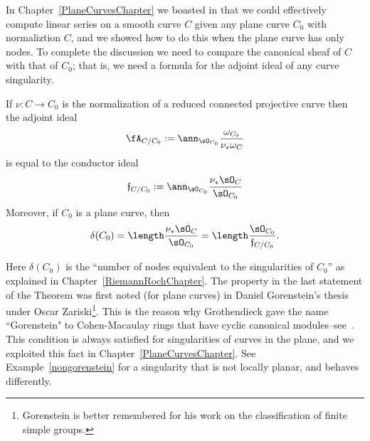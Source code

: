 In Chapter~\ref{PlaneCurvesChapter} we boasted in that we could effectively compute
linear series on a smooth curve $C$ given any plane curve $C_0$ with normaliztion $C$, 
and we showed how to do this when the plane curve has only nodes. To complete the discussion 
we need to compare the canonical sheaf of $C$ with
that of $C_0$; that is, we need a formula for the adjoint ideal of any curve singularity.



\begin{theorem}\label{general adjoint}
If $\nu: C \to C_0$ is the normalization of a reduced connected projective curve then the 
adjoint ideal 
$$
\fA_{C/C_0} :=\ann_{\sO_{C_0}}\frac{\omega_{C_0}}{\nu_* \omega_C}
$$
is equal to the conductor ideal
$$
\mathfrak f_{C/C_0}: = \ann_{\sO_{C_0}}\frac{\nu_* \sO_C}{\sO_{C_0}}	
$$
Moreover, if $C_0$ is a plane curve, then 
$$
\delta(C_0) = \length \frac{\nu_* \sO_C}{\sO_{C_0}} = \length \frac {\sO_{C_0}}{\mathfrak f_{C/C_0}}.
$$
\end{theorem}

Here $\delta(C_0)$ is the ``number of nodes equivalent to the singularities of $C_0$'' as
explained in Chapter~\ref{RiemannRochChapter}.  The property in the last statement of the
Theorem  was first noted (for plane curves) in Daniel Gorenstein's thesis under Oscar Zariski\footnote{Gorenstein is better remembered for his work on the classification of finite simple groups.}. This is the
reason why Grothendieck gave the name ``Gorenstein" to Cohen-Macaulay rings that have cyclic canonical 
modules--see~\cite{Bass}. 
This condition is always satisfied for singularities of curves in the plane, and we exploited this fact in Chapter~\ref{PlaneCurvesChapter}.
See Example~\ref{nongorenstein} for a singularity that is not locally planar, and behaves differently.


